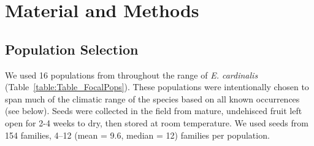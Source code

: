 \documentclass[11pt, oneside]{article}
\begin{document}
\section*{Material and Methods}


\subsection*{Population Selection}

We used 16 populations from throughout the range of \textit{E. cardinalis} (Table~\ref{table:Table_FocalPops}). These populations were intentionally chosen to span much of the climatic range of the species based on all known occurrences (see below). Seeds were collected in the field from mature, undehisced fruit left open for 2-4 weeks to dry, then stored at room temperature. We used seeds from 154 families, 4--12 (mean = 9.6, median = 12) families per population.


\end{document}
